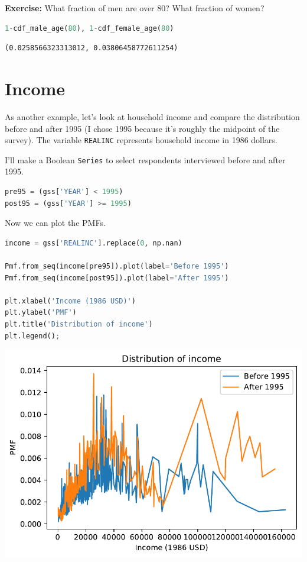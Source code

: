 \textbf{Exercise:} What fraction of men are over 80? What fraction of
women?

\begin{lstlisting}[language=Python]
1-cdf_male_age(80), 1-cdf_female_age(80)
\end{lstlisting}

\begin{lstlisting}[]
(0.0258566323313012, 0.03806458772611254)
\end{lstlisting}

\hypertarget{income}{%
\section{Income}\label{income}}

As another example, let's look at household income and compare the
distribution before and after 1995 (I chose 1995 because it's roughly
the midpoint of the survey). The variable
\passthrough{\lstinline!REALINC!} represents household income in 1986
dollars.

I'll make a Boolean \passthrough{\lstinline!Series!} to select
respondents interviewed before and after 1995.

\begin{lstlisting}[language=Python]
pre95 = (gss['YEAR'] < 1995)
post95 = (gss['YEAR'] >= 1995)
\end{lstlisting}

Now we can plot the PMFs.

\begin{lstlisting}[language=Python]
income = gss['REALINC'].replace(0, np.nan)

Pmf.from_seq(income[pre95]).plot(label='Before 1995')
Pmf.from_seq(income[post95]).plot(label='After 1995')

plt.xlabel('Income (1986 USD)')
plt.ylabel('PMF')
plt.title('Distribution of income')
plt.legend();
\end{lstlisting}

\begin{center}
\includegraphics[scale=0.75]{chapters/08_distributions_files/08_distributions_102_0.pdf}
\end{center}

